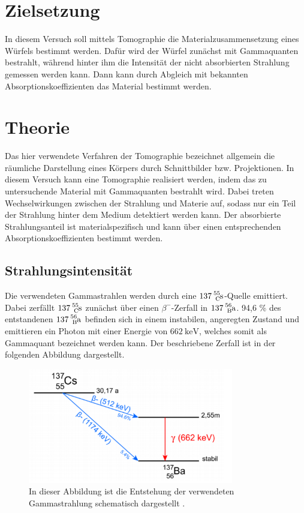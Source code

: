 \section{Zielsetzung}
\label{sec:Zielsetzung}

In diesem Versuch soll mittels Tomographie die Materialzusammensetzung eines Würfels
bestimmt werden. Dafür wird der Würfel zunächst mit Gammaquanten bestrahlt, 
während hinter ihm die Intensität der nicht absorbierten Strahlung gemessen werden 
kann. Dann kann durch Abgleich mit bekannten Absorptionskoeffizienten das Material bestimmt
werden.

\section{Theorie}
\label{sec:Theorie}

Das hier verwendete Verfahren der Tomographie bezeichnet allgemein die räumliche Darstellung 
eines Körpers durch Schnittbilder bzw. Projektionen. In diesem Versuch kann eine 
Tomographie realisiert werden, indem das zu untersuchende Material mit Gammaquanten 
bestrahlt wird. Dabei treten Wechselwirkungen zwischen der Strahlung und Materie auf, 
sodass nur ein Teil der Strahlung hinter dem Medium detektiert werden kann. 
Der absorbierte Strahlungsanteil ist materialspezifisch und kann über einen entsprechenden
Absorptionskoeffizienten bestimmt werden.

\subsection{Strahlungsintensität}

Die verwendeten Gammastrahlen werden durch eine $\ce{137^55_Cs}$-Quelle emittiert. 
Dabei zerfällt $\ce{137^55_Cs}$ zunächst über einen $\beta^-$-Zerfall in  $\ce{137^56_Ba}$.
94,6 \% des entstandenen $\ce{137^56_Ba}$ befinden sich in einem instabilen, angeregten 
Zustand und emittieren ein Photon mit einer Energie von $\SI{662}{\kilo\eV}$, welches 
somit als Gammaquant bezeichnet werden kann. 
Der beschriebene Zerfall ist in der folgenden Abbildung dargestellt.

\begin{figure}
	\centering
	\includegraphics[width=0.8\textwidth]{figure/Zerfall.pdf}
	\caption{In dieser Abbildung ist die Entstehung der verwendeten Gammastrahlung
	schematisch dargestellt \cite{1}.} 
	\label{abb1}
\end{figure}

